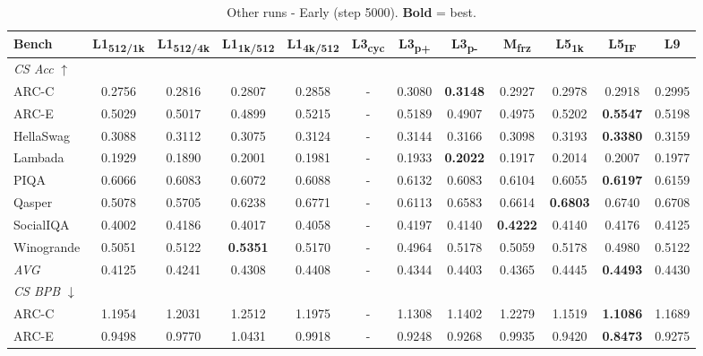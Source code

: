 \begin{table}[htbp]
\centering
\setlength{\tabcolsep}{2.5pt}
\small
\caption{Other runs - Early (step 5000). \textbf{Bold} = best.}
\label{tab:other_early}
\begin{tabular}{lccccccccccc}
\toprule
Bench & L1\textsubscript{512/1k} & L1\textsubscript{512/4k} & L1\textsubscript{1k/512} & L1\textsubscript{4k/512} & L3\textsubscript{cyc} & L3\textsubscript{p+} & L3\textsubscript{p-} & M\textsubscript{frz} & L5\textsubscript{1k} & L5\textsubscript{IF} & L9 \\
\midrule
\multicolumn{12}{l}{\textit{CS Acc} $\uparrow$} \\
ARC-C & 0.2756 & 0.2816 & 0.2807 & 0.2858 & - & 0.3080 & \textbf{0.3148} & 0.2927 & 0.2978 & 0.2918 & 0.2995 \\
ARC-E & 0.5029 & 0.5017 & 0.4899 & 0.5215 & - & 0.5189 & 0.4907 & 0.4975 & 0.5202 & \textbf{0.5547} & 0.5198 \\
HellaSwag & 0.3088 & 0.3112 & 0.3075 & 0.3124 & - & 0.3144 & 0.3166 & 0.3098 & 0.3193 & \textbf{0.3380} & 0.3159 \\
Lambada & 0.1929 & 0.1890 & 0.2001 & 0.1981 & - & 0.1933 & \textbf{0.2022} & 0.1917 & 0.2014 & 0.2007 & 0.1977 \\
PIQA & 0.6066 & 0.6083 & 0.6072 & 0.6088 & - & 0.6132 & 0.6083 & 0.6104 & 0.6055 & \textbf{0.6197} & 0.6159 \\
Qasper & 0.5078 & 0.5705 & 0.6238 & 0.6771 & - & 0.6113 & 0.6583 & 0.6614 & \textbf{0.6803} & 0.6740 & 0.6708 \\
SocialIQA & 0.4002 & 0.4186 & 0.4017 & 0.4058 & - & 0.4197 & 0.4140 & \textbf{0.4222} & 0.4140 & 0.4176 & 0.4125 \\
Winogrande & 0.5051 & 0.5122 & \textbf{0.5351} & 0.5170 & - & 0.4964 & 0.5178 & 0.5059 & 0.5178 & 0.4980 & 0.5122 \\
\textit{AVG} & 0.4125 & 0.4241 & 0.4308 & 0.4408 & - & 0.4344 & 0.4403 & 0.4365 & 0.4445 & \textbf{0.4493} & 0.4430 \\
\midrule
\multicolumn{12}{l}{\textit{CS BPB} $\downarrow$} \\
ARC-C & 1.1954 & 1.2031 & 1.2512 & 1.1975 & - & 1.1308 & 1.1402 & 1.2279 & 1.1519 & \textbf{1.1086} & 1.1689 \\
ARC-E & 0.9498 & 0.9770 & 1.0431 & 0.9918 & - & 0.9248 & 0.9268 & 0.9935 & 0.9420 & \textbf{0.8473} & 0.9275 \\

\end{tabular}
\end{table}
